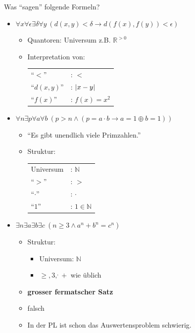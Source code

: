 \begin{bsp}
	Was \enquote{sagen} folgende Formeln?\\
	\begin{itemize}
		\item $\forall x \forall \epsilon \exists \delta \forall y~( d( x, y )  < \delta \rightarrow d( f( x ) , f( y ) ) < \epsilon )$
		\begin{itemize}
			\item Quantoren: Universum z.B. $\mathbb{R}^{>0}$
			\item Interpretation von: \\
			\begin{tabular}{ l l }
				\enquote{$<$}		& : $<$			\\
				\enquote{$d( x , y )$}	& : $\abs{x-y}$		\\
				\enquote{$f( x )$}		& : $f( x ) = x^2$	
			\end{tabular}
		\end{itemize}
		\item $\forall n \exists p \forall a \forall b~(p > n \wedge ( p = a \cdot b \rightarrow a = 1 \oplus b = 1 ) )$
		\begin{itemize}
			\item \enquote{Es gibt unendlich viele Primzahlen.}
			\item Struktur: \\
			\begin{tabular}{ l l }
				Universum	& : $\mathbb{N}$		\\
				\enquote{$>$}	& : $>$				\\
				\enquote{$\cdot$}	& : $\cdot$			\\
				\enquote{$1$}	& : $1 \in \mathbb{N}$	
			\end{tabular}
		\end{itemize}
		\item $\exists n \exists a \exists b \exists c~( n \geq 3 \wedge a^n + b^n = c^n )$
		\begin{itemize}
			\item Struktur:
			\begin{itemize}
				\item Universum: $\mathbb{N}$
				\item $\geq , 3 , ^ , +$ wie üblich
			\end{itemize}
			\item \textbf{grosser fermatscher Satz}
			\item falsch
			\item In der PL ist schon das Auswertensproblem schwierig.
		\end{itemize}
	\end{itemize}
\end{bsp}
